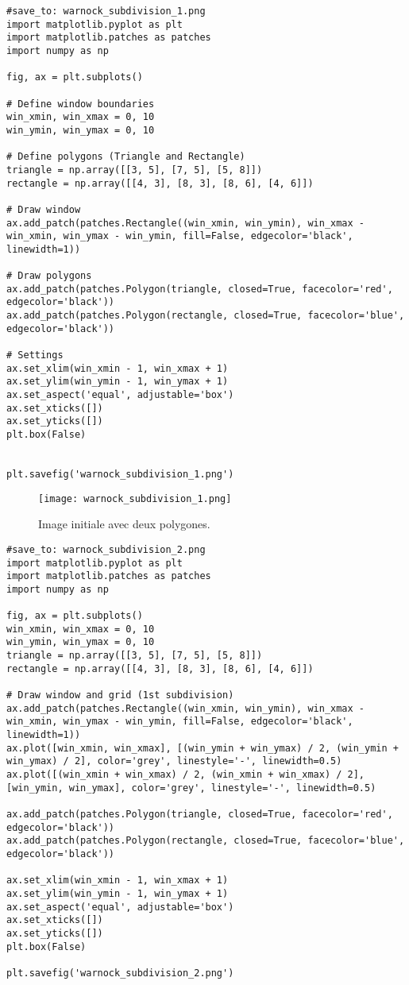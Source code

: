 \documentclass{article}
\begin{document}
\begin{verbatim}
#save_to: warnock_subdivision_1.png
import matplotlib.pyplot as plt
import matplotlib.patches as patches
import numpy as np

fig, ax = plt.subplots()

# Define window boundaries
win_xmin, win_xmax = 0, 10
win_ymin, win_ymax = 0, 10

# Define polygons (Triangle and Rectangle)
triangle = np.array([[3, 5], [7, 5], [5, 8]])
rectangle = np.array([[4, 3], [8, 3], [8, 6], [4, 6]])

# Draw window
ax.add_patch(patches.Rectangle((win_xmin, win_ymin), win_xmax - win_xmin, win_ymax - win_ymin, fill=False, edgecolor='black', linewidth=1))

# Draw polygons
ax.add_patch(patches.Polygon(triangle, closed=True, facecolor='red', edgecolor='black'))
ax.add_patch(patches.Polygon(rectangle, closed=True, facecolor='blue', edgecolor='black'))

# Settings
ax.set_xlim(win_xmin - 1, win_xmax + 1)
ax.set_ylim(win_ymin - 1, win_ymax + 1)
ax.set_aspect('equal', adjustable='box')
ax.set_xticks([])
ax.set_yticks([])
plt.box(False)


plt.savefig('warnock_subdivision_1.png')
\end{verbatim}

\begin{figure}[H]
\centering
\texttt{[image: warnock\_subdivision\_1.png]}
\caption{Image initiale avec deux polygones.}
\label{fig:warnock_subdiv_1}
\end{figure}

\begin{verbatim}
#save_to: warnock_subdivision_2.png
import matplotlib.pyplot as plt
import matplotlib.patches as patches
import numpy as np

fig, ax = plt.subplots()
win_xmin, win_xmax = 0, 10
win_ymin, win_ymax = 0, 10
triangle = np.array([[3, 5], [7, 5], [5, 8]])
rectangle = np.array([[4, 3], [8, 3], [8, 6], [4, 6]])

# Draw window and grid (1st subdivision)
ax.add_patch(patches.Rectangle((win_xmin, win_ymin), win_xmax - win_xmin, win_ymax - win_ymin, fill=False, edgecolor='black', linewidth=1))
ax.plot([win_xmin, win_xmax], [(win_ymin + win_ymax) / 2, (win_ymin + win_ymax) / 2], color='grey', linestyle='-', linewidth=0.5)
ax.plot([(win_xmin + win_xmax) / 2, (win_xmin + win_xmax) / 2], [win_ymin, win_ymax], color='grey', linestyle='-', linewidth=0.5)

ax.add_patch(patches.Polygon(triangle, closed=True, facecolor='red', edgecolor='black'))
ax.add_patch(patches.Polygon(rectangle, closed=True, facecolor='blue', edgecolor='black'))

ax.set_xlim(win_xmin - 1, win_xmax + 1)
ax.set_ylim(win_ymin - 1, win_ymax + 1)
ax.set_aspect('equal', adjustable='box')
ax.set_xticks([])
ax.set_yticks([])
plt.box(False)

plt.savefig('warnock_subdivision_2.png')
\end{verbatim}
\end{document}
